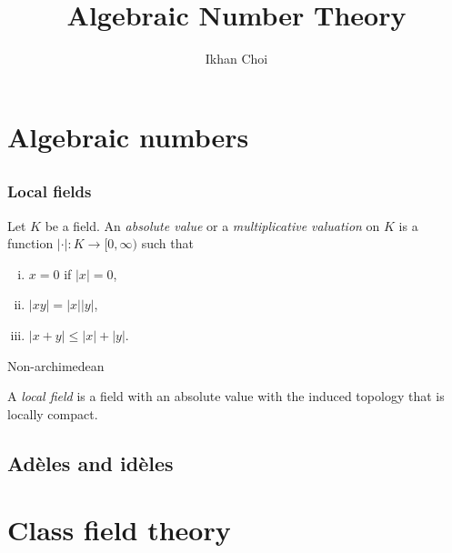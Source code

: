 \documentclass{../note}
\begin{document}
\title{Algebraic Number Theory}
\author{Ikhan Choi}
\maketitle
\tableofcontents

\part{Algebraic numbers}
\chapter{}


\section{Local fields}
\begin{prb}
Let $K$ be a field.
An \emph{absolute value} or a \emph{multiplicative valuation} on $K$ is a function $|\cdot|:K\to[0,\infty)$ such that
\begin{enumerate}[(i)]
\item $x=0$ if $|x|=0$,
\item $|xy|=|x||y|$,
\item $|x+y|\le|x|+|y|$.
\end{enumerate}
Non-archimedean
\end{prb}

\begin{prb}
A \emph{local field} is a field with an absolute value with the induced topology that is locally compact.
\end{prb}

\begin{prb}
\end{prb}

\begin{prb}[Places]
\end{prb}


\chapter{Ad\`eles and id\`eles}








\part{Class field theory}
\end{document}
